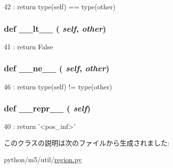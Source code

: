\begin{DoxyCode}
42 : return type(self) == type(other)
\end{DoxyCode}
\hypertarget{classm5_1_1util_1_1region_1_1__pos__inf_a6a45920abc8ecf2d458d174ea7304f8a}{
\subsubsection[{\_\-\_\-lt\_\-\_\-}]{\setlength{\rightskip}{0pt plus 5cm}def \_\-\_\-lt\_\-\_\- ( {\em self}, \/   {\em other})}}
\label{classm5_1_1util_1_1region_1_1__pos__inf_a6a45920abc8ecf2d458d174ea7304f8a}



\begin{DoxyCode}
41 : return False
\end{DoxyCode}
\hypertarget{classm5_1_1util_1_1region_1_1__pos__inf_ad69df72a6bf0be3525fe45cd2f77f343}{
\subsubsection[{\_\-\_\-ne\_\-\_\-}]{\setlength{\rightskip}{0pt plus 5cm}def \_\-\_\-ne\_\-\_\- ( {\em self}, \/   {\em other})}}
\label{classm5_1_1util_1_1region_1_1__pos__inf_ad69df72a6bf0be3525fe45cd2f77f343}



\begin{DoxyCode}
46 : return type(self) != type(other)
\end{DoxyCode}
\hypertarget{classm5_1_1util_1_1region_1_1__pos__inf_ad8b9328939df072e4740cd9a63189744}{
\subsubsection[{\_\-\_\-repr\_\-\_\-}]{\setlength{\rightskip}{0pt plus 5cm}def \_\-\_\-repr\_\-\_\- ( {\em self})}}
\label{classm5_1_1util_1_1region_1_1__pos__inf_ad8b9328939df072e4740cd9a63189744}



\begin{DoxyCode}
40 : return '<pos_inf>'
\end{DoxyCode}


このクラスの説明は次のファイルから生成されました:\begin{DoxyCompactItemize}
\item 
python/m5/util/\hyperlink{region_8py}{region.py}\end{DoxyCompactItemize}
